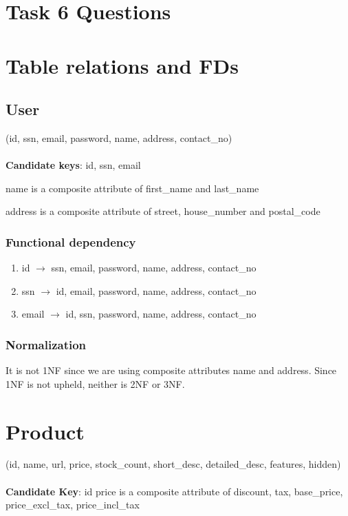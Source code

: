 \documentclass{article}
\begin{document}
\section*{Task 6 Questions}

\section{Table relations and FDs}

\subsection{User}
(id, ssn, email, password, name, address, contact\_no)\\\\
\textbf{Candidate keys}: {id}, {ssn}, {email}

name is a composite attribute of first\_name and last\_name



address is a composite attribute of street, house\_number and postal\_code


\subsubsection*{Functional dependency}
\begin{enumerate}[$\bullet$]
  \item
id $\rightarrow$ ssn, email, password, name, address, contact\_no
\item
ssn $\rightarrow$ id, email, password, name, address, contact\_no
\item
email $\rightarrow$ id, ssn, password, name, address, contact\_no
\end{enumerate}
\subsubsection*{Normalization}
It is not 1NF since we are using composite attributes name and address. Since 1NF is not upheld, neither is 2NF or 3NF.



\section{Product}
(id, name, url, price, stock\_count, short\_desc, detailed\_desc, features, hidden)\\\\
\textbf{Candidate Key}: id
price is a composite attribute of discount, tax, base\_price, price\_excl\_tax, price\_incl\_tax
\end{document}
